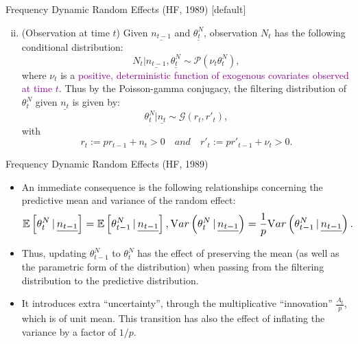 \documentclass[ignorenonframetext,]{beamer}
\begin{document}
\begin{frame}{Frequency Dynamic Random Effects (HF, 1989)}
[default]
\begin{enumerate}[i.]
\setcounter{enumi}{1}
\item (Observation at time $t$) Given $\underline{n_{t-1}}$ and $\underline{\theta^N_t}$, observation $N_t$ has the following conditional distribution:
$$
N_t|\underline{n_{t-1}}, \underline{\theta^N_t} \sim \mathcal{P}\left(\nu_t\theta^N_t\right),
$$
where $\nu_t$ is a \textcolor{purple}{positive, deterministic function of exogenous covariates observed at time $t$}.
Thus by the Poisson-gamma conjugacy, the filtering distribution of $\theta^N_t$ given $\underline{n_t}$ is given by:
\begin{equation}\label{p3:freqfilt}
\theta^N_t|\underline{n_t} \sim \mathcal{G}\left(r_t, r'_t\right),
\end{equation}
with
$$
r_t := pr_{t-1} + n_t > 0 \quad and \quad r'_t := pr'_{t-1} + \nu_t > 0.
$$
\end{enumerate}
\end{frame}

\begin{frame}{Frequency Dynamic Random Effects (HF, 1989)}
\begin{itemize}
\item An immediate consequence is the following relationships concerning the predictive mean and variance of the random effect:
$$
\resizebox{\linewidth}{!}{$\displaystyle
\E{\theta^N_t \,|\, \underline{n_{t-1}}} = \E{\theta^N_{t-1} \,|\, \underline{n_{t-1}}}, \Var{\theta^N_t \,|\, \underline{n_{t-1}}} = \frac{1}{p}\Var{\theta^N_{t-1} \,|\, \underline{n_{t-1}}}.$}
$$
\item Thus, updating $\theta^N_{t-1}$ to $\theta^N_t$ has the effect of preserving the mean (as well as the parametric form of the distribution) when passing from the filtering distribution to the predictive distribution.
\item It introduces extra ``uncertainty'', through the multiplicative ``innovation'' $\frac{A_t}{p}$, which is of unit mean.
This transition has also the effect of inflating the variance by a factor of $1/p$.
\end{itemize}
\end{frame}
\end{document}
